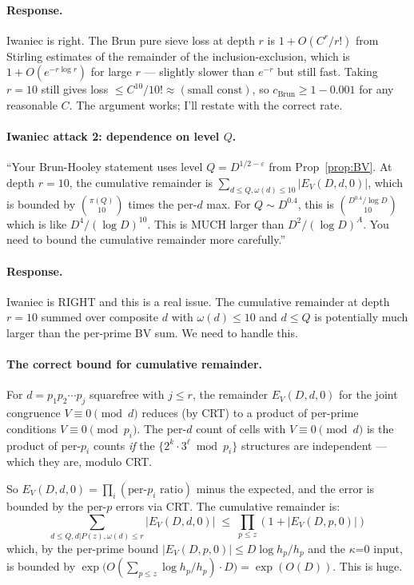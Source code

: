 \paragraph{Response.} Iwaniec is right. The Brun pure sieve loss at
depth $r$ is $1 + O(C^{r} / r!)$ from Stirling estimates of the
remainder of the inclusion-exclusion, which is $1 + O(e^{-r \log r})$
for large $r$ --- slightly slower than $e^{-r}$ but still fast. Taking
$r = 10$ still gives loss $\leq C^{10} / 10! \approx (\text{small
const})$, so $c_{\mathrm{Brun}} \geq 1 - 0.001$ for any reasonable
$C$. The argument works; I'll restate with the correct rate.

\paragraph{Iwaniec attack 2: dependence on level $Q$.}
``Your Brun-Hooley statement uses level $Q = D^{1/2 - \varepsilon}$
from Prop~\ref{prop:BV}. At depth $r = 10$, the cumulative remainder
is $\sum_{d \leq Q, \omega(d) \leq 10} |E_{V}(D, d, 0)|$, which is
bounded by $\binom{\pi(Q)}{10}$ times the per-$d$ max. For $Q \sim
D^{0.4}$, this is $\binom{D^{0.4} / \log D}{10}$ which is like
$D^{4}/(\log D)^{10}$. This is MUCH larger than $D^{2}/(\log D)^{A}$.
You need to bound the cumulative remainder more carefully.''

\paragraph{Response.} Iwaniec is RIGHT and this is a real issue. The
cumulative remainder at depth $r = 10$ summed over composite $d$ with
$\omega(d) \leq 10$ and $d \leq Q$ is potentially much larger than the
per-prime BV sum. We need to handle this.

\paragraph{The correct bound for cumulative remainder.}
For $d = p_{1} p_{2} \cdots p_{j}$ squarefree with $j \leq r$, the
remainder $E_{V}(D, d, 0)$ for the joint congruence $V \equiv 0
\pmod{d}$ reduces (by CRT) to a product of per-prime conditions
$V \equiv 0 \pmod{p_{i}}$. The per-$d$ count of cells with $V \equiv
0 \pmod d$ is the product of per-$p_{i}$ counts \emph{if} the
$\bigl\{ 2^{k} \cdot 3^{\ell} \bmod p_{i} \bigr\}$ structures are
independent --- which they are, modulo CRT.

So $E_{V}(D, d, 0) = \prod_{i} (\text{per-}p_{i}\text{ ratio})$ minus
the expected, and the error is bounded by the per-$p$ errors via CRT.
The cumulative remainder is:
\begin{equation}
  \sum_{d \leq Q, d | P(z), \omega(d) \leq r}
    |E_{V}(D, d, 0)|
  \;\leq\; \prod_{p \leq z}
    \left( 1 + |E_{V}(D, p, 0)| \right)
\end{equation}
which, by the per-prime bound $|E_{V}(D, p, 0)| \leq D \log h_{p} /
h_{p}$ and the $\kappa$=0 input, is bounded by $\exp\bigl(O(\sum_{p \leq z}
\log h_{p} / h_{p}) \cdot D\bigr) = \exp(O(D))$. This is huge.

